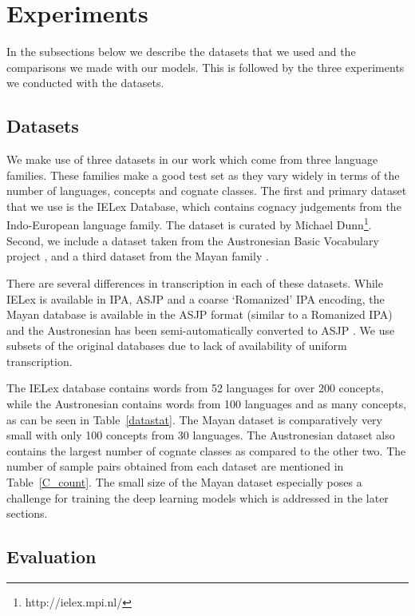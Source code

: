 \documentclass[11pt,letterpaper]{article}
\begin{document}
\section{Experiments}

In the subsections below we describe the datasets that we used and the comparisons we made with our models. This is followed by the three experiments we conducted with the datasets.

\subsection{Datasets}

We make use of three datasets in our work which come from three language families. These families make a good test set as they vary widely in terms of the number of languages, concepts and cognate classes. The first and primary dataset that we use is the IELex Database, which contains cognacy judgements from the Indo-European language family. The dataset is curated by Michael Dunn\footnote{http://ielex.mpi.nl/}. Second, we include a dataset taken from the Austronesian Basic Vocabulary project \cite{greenhillBlust:08}, and a third dataset from the Mayan family \cite{wichmann:2008}. 

There are several differences in transcription in each of these datasets. While IELex is available in IPA, ASJP and a coarse `Romanized' IPA encoding, the Mayan database is available in the ASJP format (similar to a Romanized IPA) \cite{Brown:08} and the Austronesian has been semi-automatically converted to ASJP \cite{rama2016siamese}. We use subsets of the original databases due to lack of availability of uniform transcription.

The IELex database contains words from 52 languages for over 200 concepts, while the Austronesian contains words from 100 languages and as many concepts, as can be seen in Table~\ref{datastat}. The Mayan dataset is comparatively very small with only 100 concepts from 30 languages. The Austronesian dataset also contains the largest number of cognate classes as compared to the other two. The number of sample pairs obtained from each dataset are mentioned in Table~\ref{C_count}. The small size of the Mayan dataset especially poses a challenge for training the deep learning models which is addressed in the later sections. 


\subsection{Evaluation}
\end{document}
